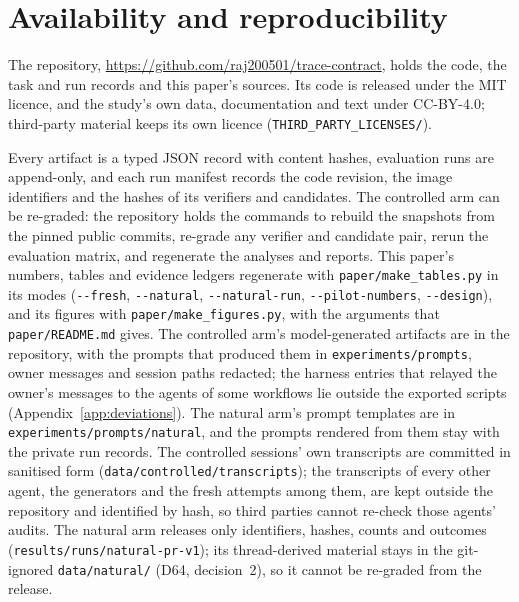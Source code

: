 \section{Availability and reproducibility}
\label{sec:repro}
The repository, \url{https://github.com/raj200501/trace-contract}, holds the code, the task and run records and
this paper's sources. Its code is released under the MIT licence, and the study's own data, documentation and text
under CC-BY-4.0; third-party material keeps its own licence (\texttt{THIRD\_PARTY\_LICENSES/}).

Every artifact is a typed JSON record with content hashes, evaluation runs are append-only, and each run manifest records the code revision, the image identifiers and the hashes of its verifiers and candidates. The controlled arm can be re-graded: the repository holds the commands to rebuild the snapshots from the pinned public commits, re-grade any verifier and candidate pair, rerun the evaluation matrix, and regenerate the analyses and reports. This paper's numbers, tables and evidence ledgers regenerate with \texttt{paper/make\_tables.py} in its modes (\texttt{-{}-fresh}, \texttt{-{}-natural}, \texttt{-{}-natural-run}, \texttt{-{}-pilot-numbers}, \texttt{-{}-design}), and its figures with \texttt{paper/make\_figures.py}, with the arguments that \texttt{paper/README.md} gives. The controlled arm's model-generated artifacts are in the repository, with the prompts that produced them in \texttt{experiments/prompts}, owner messages and session paths redacted; the harness entries that relayed the owner's messages to the agents of some workflows lie outside the exported scripts (Appendix~\ref{app:deviations}). The natural arm's prompt templates are in \texttt{experiments/prompts/natural}, and the prompts rendered from them stay with the private run records. The controlled sessions' own transcripts are committed in sanitised form (\texttt{data/controlled/transcripts}); the transcripts of every other agent, the generators and the fresh attempts among them, are kept outside the repository and identified by hash, so third parties cannot re-check those agents' audits. The natural arm releases only identifiers, hashes, counts and outcomes (\texttt{results/runs/natural-pr-v1}); its thread-derived material stays in the git-ignored \texttt{data/natural/} (D64, decision~2), so it cannot be re-graded from the release.

